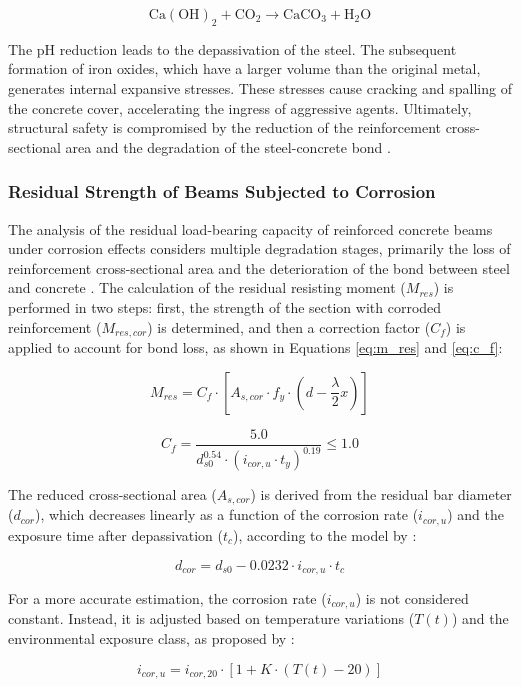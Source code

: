 \begin{equation}\label{eq:carbonation}
\mathrm{Ca(OH)_2 + CO_2 \rightarrow CaCO_3 + H_2O}
\end{equation}

The pH reduction leads to the depassivation of the steel. The subsequent formation of iron oxides, which have a larger volume than the original metal, generates internal expansive stresses. These stresses cause cracking and spalling of the concrete cover, accelerating the ingress of aggressive agents. Ultimately, structural safety is compromised by the reduction of the reinforcement cross-sectional area and the degradation of the steel-concrete bond \cite{tuutti_corrosion_1982, soltani_state---art_2019}.

\subsubsection{Residual Strength of Beams Subjected to Corrosion}

The analysis of the residual load-bearing capacity of reinforced concrete beams under corrosion effects considers multiple degradation stages, primarily the loss of reinforcement cross-sectional area and the deterioration of the bond between steel and concrete \cite{possan_co2_2016, Azad2010}. The calculation of the residual resisting moment ($M_{res}$) is performed in two steps: first, the strength of the section with corroded reinforcement ($M_{res,cor}$) is determined, and then a correction factor ($C_f$) is applied to account for bond loss, as shown in Equations \eqref{eq:m_res} and \eqref{eq:c_f}:

\begin{equation}\label{eq:m_res}
M_{res} = C_f \cdot \left[ A_{s,cor} \cdot f_y \cdot \left( d - \frac{\lambda}{2} x \right) \right]
\end{equation}

\begin{equation}\label{eq:c_f}
C_f = \frac{5.0}{d_{s0}^{0.54} \cdot (i_{cor,u} \cdot t_y)^{0.19}} \leq 1.0
\end{equation}

The reduced cross-sectional area ($A_{s,cor}$) is derived from the residual bar diameter ($d_{cor}$), which decreases linearly as a function of the corrosion rate ($i_{cor,u}$) and the exposure time after depassivation ($t_c$), according to the model by \textcite{pellizzer_time-dependent_2020}:

\begin{equation}\label{eq:d_cor}
d_{cor} = d_{s0} - 0.0232 \cdot i_{cor,u} \cdot t_c
\end{equation}

For a more accurate estimation, the corrosion rate ($i_{cor,u}$) is not considered constant. Instead, it is adjusted based on temperature variations ($T(t)$) and the environmental exposure class, as proposed by \textcite{peng_climate_2016}:

\begin{equation}\label{eq:i_cor_t}
i_{cor,u} = i_{cor,20} \cdot \left[ 1 + K \cdot (T(t) - 20) \right]
\end{equation}